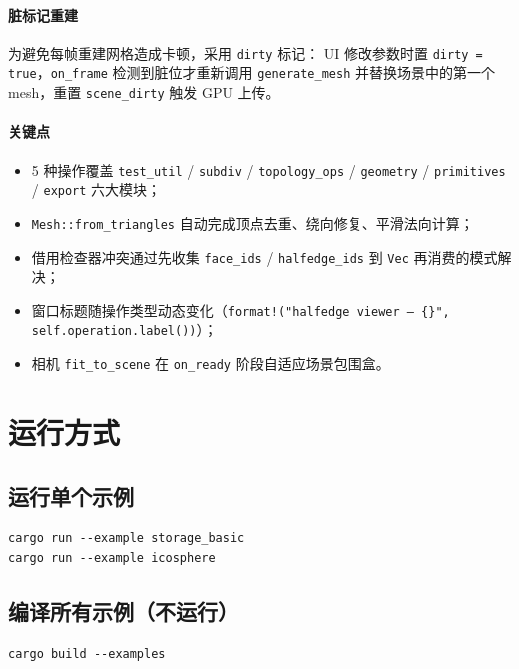 \documentclass[11pt,a4paper]{article}
\begin{document}
\paragraph{脏标记重建}
为避免每帧重建网格造成卡顿，采用 \texttt{dirty} 标记：
UI 修改参数时置 \texttt{dirty = true}，\texttt{on\_frame} 检测到脏位才重新调用
\texttt{generate\_mesh} 并替换场景中的第一个 mesh，重置 \texttt{scene\_dirty} 触发 GPU 上传。

\paragraph{关键点}
\begin{itemize}
  \item 5 种操作覆盖 \texttt{test\_util} / \texttt{subdiv} / \texttt{topology\_ops} / \texttt{geometry} / \texttt{primitives} / \texttt{export} 六大模块；
  \item \texttt{Mesh::from\_triangles} 自动完成顶点去重、绕向修复、平滑法向计算；
  \item 借用检查器冲突通过先收集 \texttt{face\_ids} / \texttt{halfedge\_ids} 到 \texttt{Vec} 再消费的模式解决；
  \item 窗口标题随操作类型动态变化（\texttt{format!("halfedge viewer — \{\}", self.operation.label())}）；
  \item 相机 \texttt{fit\_to\_scene} 在 \texttt{on\_ready} 阶段自适应场景包围盒。
\end{itemize}

\section{运行方式}

\subsection{运行单个示例}

\begin{lstlisting}
cargo run --example storage_basic
cargo run --example icosphere
\end{lstlisting}

\subsection{编译所有示例（不运行）}

\begin{lstlisting}
cargo build --examples
\end{lstlisting}
\end{document}
